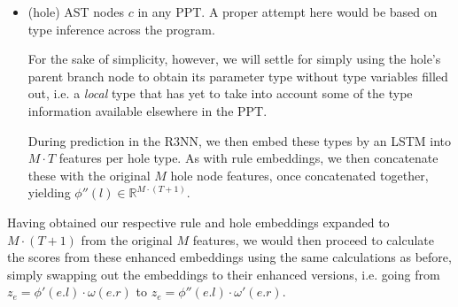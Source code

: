 \documentclass{article}
\begin{document}
\begin{itemize}
    \item (hole) AST nodes $c$ in any PPT.
    A proper attempt here would be based on type inference across the program.

    For the sake of simplicity, however, we will settle for simply using the hole's
    parent branch node to obtain its parameter type without type variables filled out,
    i.e. a \emph{local} type that has yet to take into account some of the type information available elsewhere in the PPT.

    During prediction in the R3NN, we then embed these types by an LSTM into $M \cdot T$ features per hole type.
    As with rule embeddings, we then concatenate these with the original $M$ hole node features,
    once concatenated together, yielding $\phi''(l) \in \mathbb{R}^{M \cdot (T+1)}$.

\end{itemize}

Having obtained our respective rule and hole embeddings expanded to $M \cdot (T+1)$ from the original $M$ features,
we would then proceed to calculate the scores from these enhanced embeddings using the same calculations as before,
simply swapping out the embeddings to their enhanced versions,
i.e. going from $z_e = \phi'(e.l) \cdot \omega(e.r)$ to $z_e = \phi''(e.l) \cdot \omega'(e.r)$.
\end{document}
